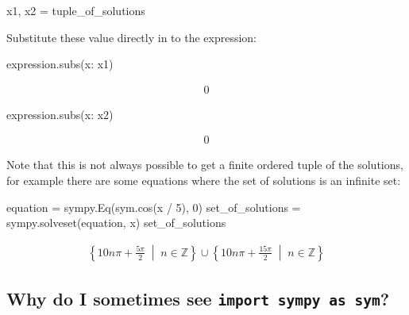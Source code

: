 \begin{pyin}
x1, x2 = tuple_of_solutions
\end{pyin}

Substitute these value directly in to the expression:

\begin{pyin}
expression.subs({x: x1})
\end{pyin}




\begin{equation*}
\begin{split}\displaystyle 0\end{split}
\end{equation*}






\begin{pyin}
expression.subs({x: x2})
\end{pyin}




\begin{equation*}
\begin{split}\displaystyle 0\end{split}
\end{equation*}




Note that this is not always possible to get a finite ordered tuple of the
solutions, for example there are some equations
where the set of solutions is an infinite set:




\begin{pyin}
equation = sympy.Eq(sym.cos(x / 5), 0)
set_of_solutions = sympy.solveset(equation, x)
set_of_solutions
\end{pyin}




\begin{equation*}
\begin{split}\displaystyle \left\{10 n \pi + \frac{5 \pi}{2}\; \middle|\; n \in \mathbb{Z}\right\} \cup \left\{10 n \pi + \frac{15 \pi}{2}\; \middle|\; n \in \mathbb{Z}\right\}\end{split}
\end{equation*}




\subsection{Why do I sometimes see \texttt{import sympy as sym}?}
\label{\detokenize{tools-for-mathematics/02-algebra/why/main:why-do-i-sometimes-see-import-sympy-as-sym}}

